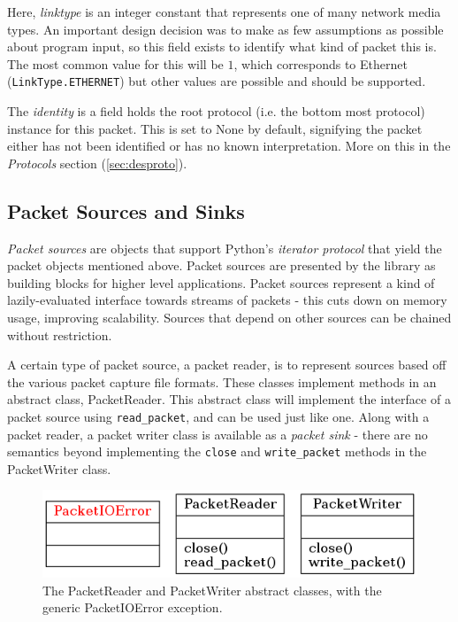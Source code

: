 \documentclass[10pt,a4paper,notitlepage]{report}
\begin{document}
Here, \emph{linktype} is an integer constant that represents one of many network media types. An important design decision was to make as few assumptions as possible about program input, so this field exists to identify what kind of packet this is. The most common value for this will be $1$, which corresponds to Ethernet (\texttt{LinkType.ETHERNET}) but other values are possible and should be supported.

The \emph{identity} is a field holds the root protocol (i.e. the bottom most protocol) instance for this packet. This is set to None by default, signifying the packet either has not been identified or has no known interpretation. More on this in the \emph{Protocols} section (\ref{sec:desproto}).

\subsection{Packet Sources and Sinks}
\emph{Packet sources} are objects that support Python's \emph{iterator protocol} that yield the packet objects mentioned above. Packet sources are presented by the library as building blocks for higher level applications.
Packet sources represent a kind of lazily-evaluated interface towards streams of packets - this cuts down on memory usage, improving scalability. Sources that depend on other sources can be chained without restriction.

A certain type of packet source, a packet reader, is to represent sources based off the various packet capture file formats. These classes implement methods in an abstract class, PacketReader. This abstract class will implement the interface of a packet source using \texttt{read_packet}, and can be used just like one. Along with a packet reader, a packet writer class is available as a \emph{packet sink} - there are no semantics beyond implementing the \texttt{close} and \texttt{write_packet} methods in the PacketWriter class.

\begin{figure}[H]
\center
\includegraphics[scale=0.7]{diagrams/packetio.png}
\caption{The PacketReader and PacketWriter abstract classes, with the generic PacketIOError exception.}
\end{figure}
\end{document}

